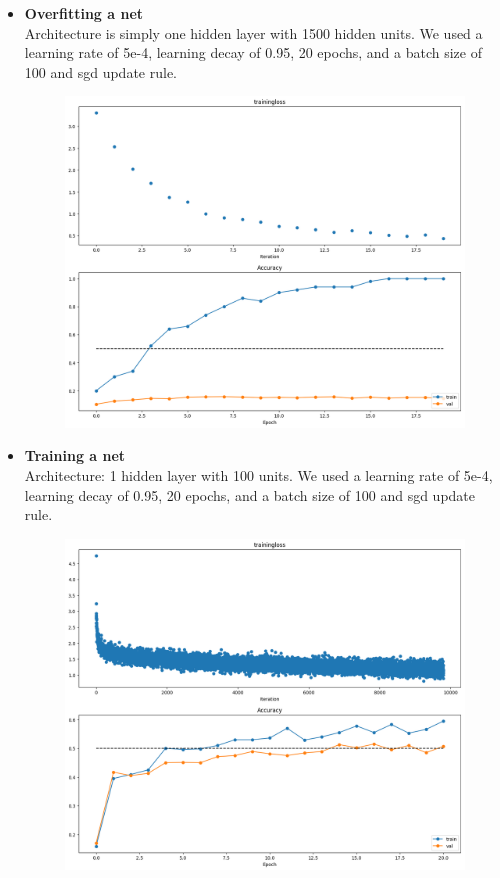 \begin{itemize}

  \item \textbf{Overfitting a net}\\
    Architecture is simply one hidden layer with 1500 hidden units.
    We used a learning rate of 5e-4, learning decay of 0.95, 20 epochs, and a batch size of 100 and sgd update rule.

    \begin{figure}[!ht]
        \centering
        {{\includegraphics[scale = 0.45]{../nets/overfit_net/diagrams.png}}}  
    \end{figure}


  \item \textbf{Training a net}\\
    Architecture: 1 hidden layer with 100 units.
    We used a learning rate of 5e-4, learning decay of 0.95, 20 epochs, and a batch size of 100 and sgd update rule.

    \begin{figure}[!ht]
        \centering
        {{\includegraphics[scale = 0.45]{../nets/train_net/diagrams.png}}}  
    \end{figure}


\end{itemize}
